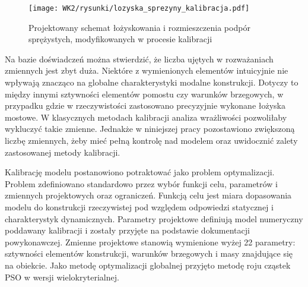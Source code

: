 \begin{figure}[hbt!]
	\centering
	\texttt{[image: WK2/rysunki/lozyska\_sprezyny\_kalibracja.pdf]}
	\captionsetup{justification=centering}
	\caption{Projektowany schemat łożyskowania i rozmieszczenia podpór sprężystych, modyfikowanych w procesie kalibracji}
	\label{fig:boudary_conditions_stiff_bearings}
\end{figure}
Na bazie doświadczeń można stwierdzić, że liczba ujętych w rozważaniach zmiennych jest zbyt duża. Niektóre z wymienionych elementów intuicyjnie nie wpływają znacząco na globalne charakterystyki modalne konstrukcji. Dotyczy to między innymi sztywności elementów pomostu czy warunków brzegowych, w przypadku gdzie w rzeczywistości zastosowano precyzyjnie wykonane łożyska mostowe. W klasycznych metodach kalibracji analiza wrażliwości pozwoliłaby wykluczyć takie zmienne. Jednakże w niniejszej pracy pozostawiono zwiększoną liczbę zmiennych, żeby mieć pełną kontrolę nad modelem oraz uwidocznić zalety zastosowanej metody kalibracji.

Kalibrację modelu postanowiono potraktować jako problem optymalizacji. Problem zdefiniowano standardowo przez wybór funkcji celu, parametrów i zmiennych projektowych oraz ograniczeń. Funkcją celu jest miara dopasowania modelu do konstrukcji rzeczywistej pod względem odpowiedzi statycznej i charakterystyk dynamicznych. Parametry projektowe definiują model numeryczny poddawany kalibracji i zostały przyjęte na podstawie dokumentacji powykonawczej. Zmienne projektowe stanowią wymienione wyżej 22 parametry: sztywności elementów konstrukcji, warunków brzegowych i masy znajdujące się na obiekcie. Jako metodę optymalizacji globalnej przyjęto metodę roju cząstek PSO w wersji wielokryterialnej. 


